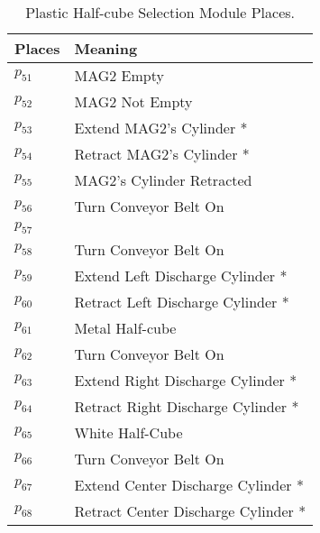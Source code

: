 \begin{table}[H]
\caption{Plastic Half-cube Selection Module Places.}
\centering
\begin{tabular}{M{5cm}M{10cm}}
Places & Meaning\\
\hline
\hyperlink{partialNet:p511}{\hypertarget{partialTable:p51}{$p_{51}$}} & MAG2 Empty\\
\hyperlink{partialNet:p521}{\hypertarget{partialTable:p52}{$p_{52}$}} & MAG2 Not Empty\\
\hyperlink{partialNet:p531}{\hypertarget{partialTable:p53}{$p_{53}$}} & Extend MAG2's Cylinder *\\
\hyperlink{partialNet:p541}{\hypertarget{partialTable:p54}{$p_{54}$}} & Retract MAG2's Cylinder *\\
\hyperlink{partialNet:p551}{\hypertarget{partialTable:p55}{$p_{55}$}} & MAG2's Cylinder Retracted\\
\hyperlink{partialNet:p561}{\hypertarget{partialTable:p56}{$p_{56}$}} & Turn Conveyor Belt On\\
\hyperlink{partialNet:p571}{\hypertarget{partialTable:p57}{$p_{57}$}} & \\
\hyperlink{partialNet:p581}{\hypertarget{partialTable:p58}{$p_{58}$}} & Turn Conveyor Belt On\\
\hyperlink{partialNet:p591}{\hypertarget{partialTable:p59}{$p_{59}$}} & Extend Left Discharge Cylinder *\\
\hyperlink{partialNet:p601}{\hypertarget{partialTable:p60}{$p_{60}$}} & Retract Left Discharge Cylinder *\\
\hyperlink{partialNet:p611}{\hypertarget{partialTable:p61}{$p_{61}$}} & Metal Half-cube\\
\hyperlink{partialNet:p621}{\hypertarget{partialTable:p62}{$p_{62}$}} & Turn Conveyor Belt On\\
\hyperlink{partialNet:p631}{\hypertarget{partialTable:p63}{$p_{63}$}} & Extend Right Discharge Cylinder *\\
\hyperlink{partialNet:p641}{\hypertarget{partialTable:p64}{$p_{64}$}} & Retract Right Discharge Cylinder *\\
\hyperlink{partialNet:p651}{\hypertarget{partialTable:p65}{$p_{65}$}} & White Half-Cube\\
\hyperlink{partialNet:p661}{\hypertarget{partialTable:p66}{$p_{66}$}} & Turn Conveyor Belt On\\
\hyperlink{partialNet:p671}{\hypertarget{partialTable:p67}{$p_{67}$}} & Extend Center Discharge Cylinder *\\
\hyperlink{partialNet:p681}{\hypertarget{partialTable:p68}{$p_{68}$}} & Retract Center Discharge Cylinder *\\

\end{tabular}
\end{table}
